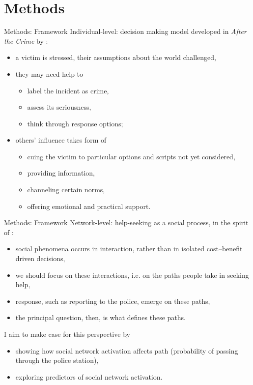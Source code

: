 \documentclass{beamer}
\newcommand\citet{
	\textcite
}
\begin{document}
	\section{Methods}
	\begin{frame}{Methods: Framework}
		Individual-level: decision making model developed in \textit{After the Crime} by\citet{greenberg1992after}:
			\begin{itemize}
				\item a victim is stressed, their assumptions about the world challenged,
				\item they may need help to
				\begin{itemize}
					\item label the incident as crime, 
					\item assess its seriousness, 
					\item think through response options;
				\end{itemize} 
				\item others' influence takes form of 
				\begin{itemize}
					\item cuing the victim to particular options and scripts not yet considered,
					\item providing information, 
					\item channeling certain norms, 
					\item offering emotional and practical support.  
				\end{itemize}
			\end{itemize}		
	\end{frame}

	\begin{frame}{Methods: Framework}
		Network-level: help-seeking as a social process, in the spirit of\citet{pescosolido1992beyond}:
		\begin{itemize}
			\item social phenomena occurs in interaction, rather than in isolated cost--benefit driven decisions,
			\item we should focus on these interactions, i.e. on the paths people take in seeking help,
			\item response, such as reporting to the police, emerge on these paths,
			\item the principal question, then, is what defines these paths.
		\end{itemize}		
		
		I aim to make case for this perspective by
		\begin{itemize}
			\item showing how social network activation affects path (probability of passing through the police station),
			\item exploring predictors of social network activation.
		\end{itemize}
	
	\end{frame}
\end{document}
